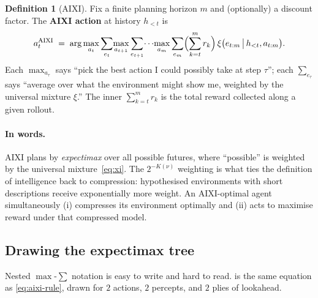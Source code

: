 \documentclass[12pt,a4paper]{article}
\theoremstyle{plain}
\theoremstyle{definition}
\newtheorem{definition}[theorem]{Definition}
\begin{document}
\begin{definition}[AIXI]
\label{def:aixi}
Fix a finite planning horizon $m$ and (optionally) a discount factor.
The \textbf{AIXI action} at history $h_{<t}$ is
\begin{equation}
  a_t^{\mathrm{AIXI}}
  \;=\; \arg\max_{a_t}
        \sum_{e_t}\!\max_{a_{t+1}}\sum_{e_{t+1}}\!\cdots\!\max_{a_m}\sum_{e_m}
        \Bigl(\sum_{k=t}^{m} r_k\Bigr)\,
        \xi\bigl(e_{t:m}\,\big|\,h_{<t}, a_{t:m}\bigr).
  \label{eq:aixi-rule}
\end{equation}
Each $\max_{a_\tau}$ says ``pick the best action I could possibly take
at step $\tau$''; each $\sum_{e_\tau}$ says ``average over what the
environment might show me, weighted by the universal mixture $\xi$.''
The inner $\sum_{k=t}^{m} r_k$ is the total reward collected along a
given rollout.
\end{definition}

\paragraph{In words.}  AIXI plans by \emph{expectimax} over all
possible futures, where ``possible'' is weighted by the universal
mixture~\eqref{eq:xi}.  The $2^{-K(\nu)}$ weighting is what ties the
definition of intelligence back to compression: hypothesised
environments with short descriptions receive exponentially more
weight.  An AIXI-optimal agent simultaneously (i) compresses its
environment optimally and (ii) acts to maximise reward under that
compressed model.

\subsection*{Drawing the expectimax tree}

Nested $\max$-$\sum$ notation is easy to write and hard to read.
 is the same equation as \eqref{eq:aixi-rule},
drawn for $2$ actions, $2$ percepts, and $2$ plies of lookahead.
\end{document}
